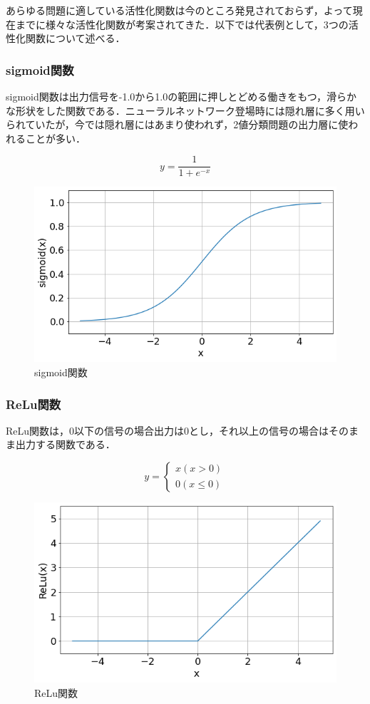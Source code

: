\documentclass[a4j, 11pt]{jreport}
\begin{document}
あらゆる問題に適している活性化関数は今のところ発見されておらず，よって現在までに様々な活性化関数が考案されてきた．以下では代表例として，3つの活性化関数について述べる．
\subsubsection{sigmoid関数}
sigmoid関数は出力信号を-1.0から1.0の範囲に押しとどめる働きをもつ，滑らかな形状をした関数である．ニューラルネットワーク登場時には隠れ層に多く用いられていたが，今では隠れ層にはあまり使われず，2値分類問題の出力層に使われることが多い．

\begin{equation}
 y = \frac{1}{1 + e^{-x}}
 \label{eq:sigmoid}
\end{equation}

\begin{figure}[H]
 \centering
 \includegraphics[width=0.7\hsize, keepaspectratio]{images/sigmoid.png}
 \caption{sigmoid関数}
 \label{fig:sigmoid}
\end{figure}

\subsubsection{ReLu関数}
ReLu関数\cite{Glorot2011}は，0以下の信号の場合出力は0とし，それ以上の信号の場合はそのまま出力する関数である．

\begin{equation}
  y= \left \{
  \begin{array}{l}
  x　(x > 0)\\
  0　(x \leq 0)
  \end{array}
  \right.
  \label{eq:relu}
  \end{equation}

\begin{figure}[H]
  \centering
  \includegraphics[width=0.7\hsize, keepaspectratio]{images/relu.png}
  \caption{ReLu関数}
  \label{fig:relu}
 \end{figure}
\end{document}
